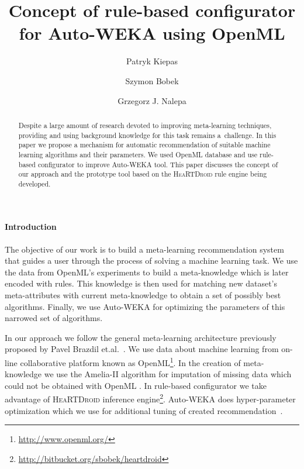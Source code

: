 \documentclass[a4paper]{llncs}
\newcommand{\HRTD}{\textsc{HeaRTDroid}\xspace}
\let\oldparagraph\paragraph
\renewcommand{\paragraph}[1]{\oldparagraph{\textbf{#1}}}
\begin{document}
	
\frontmatter
\pagestyle{headings}

\mainmatter
\title{Concept of rule-based configurator for Auto-WEKA using OpenML}

\author{Patryk Kiepas \and Szymon Bobek \and  Grzegorz J. Nalepa}


\maketitle

\begin{abstract}
Despite a large amount of research devoted to improving meta-learning techniques, providing and using background knowledge for this task remains a~challenge. In this paper we propose a mechanism for automatic recommendation of suitable machine learning algorithms and their parameters. We used OpenML database and use rule-based configurator to improve Auto-WEKA tool. This paper discusses the concept of our approach and the prototype tool based on the \HRTD rule engine being developed.
\end{abstract}

\vspace{-1em}

\paragraph{Introduction}

The objective of our work is to build a meta-learning recommendation system that guides a user through the process of solving a machine learning task. We use the data from OpenML's experiments to  build a meta-knowledge which is later encoded with rules. This knowledge is then used for matching new dataset's meta-attributes with current meta-knowledge to obtain a set of possibly best algorithms. Finally, we use Auto-WEKA for optimizing the parameters of this narrowed set of algorithms.

In our approach we follow the general meta-learning architecture previously proposed by Pavel Brazdil et.al.~\cite{VilaltaBook}. We use data about machine learning from on-line collaborative platform known as OpenML\footnote{\url{http://www.openml.org/}}. In the creation of meta-knowledge we use the Amelia-II algorithm for imputation of missing data which could not be obtained with OpenML \cite{HonakerKingBlackwell2011}. In rule-based configurator we take advantage of \HRTD inference engine\footnote{\url{http://bitbucket.org/sbobek/heartdroid}}. Auto-WEKA does hyper-parameter optimization which we use for additional tuning of created recommendation~\cite{ThoHutHooLey13-AutoWEKA}. 
\end{document}
